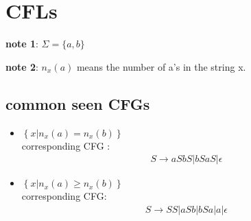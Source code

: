 \documentclass{article}
\begin{document}
\section{CFLs}

    \textbf{note 1}: $\Sigma=\{a,b\}$

    \textbf{note 2}: $n_x(a)$ means the number of a's in the string x.

\subsection{common seen CFGs}
    \begin{itemize}
        \item  $\left\{x| n_x(a)=n_x(b)\right\}$ \\ corresponding CFG : 
            \begin{align*}
                S \rightarrow aSbS | bSaS | \epsilon
            \end{align*}
        \item $\left\{x | n_x(a)\geq n_x(b)\right\}$ \\corresponding CFG:
            \begin{align*}
                S \rightarrow SS | aSb | bSa | a | \epsilon
            \end{align*}


\end{itemize}
\end{document}
